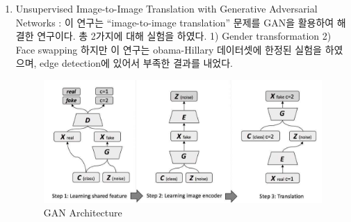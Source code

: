 \documentclass{oblivoir}
\begin{document}
\begin{enumerate}
\item Unsupervised Image-to-Image Translation with Generative Adversarial Networks : 이 연구는 “image-to-image translation” 문제를 GAN을 활용하여 해결한 연구이다. 총 2가지에 대해 실험을 하였다. 1) Gender transformation 2) Face swapping 하지만 이 연구는 obama-Hillary 데이터셋에 한정된 실험을 하였으며, edge detection에 있어서 부족한 결과를 내었다.

\begin{figure}[h!]
    \centering
      \includegraphics{pic/chp1/img613}
    \caption{ GAN Architecture\cite{reference5}}
\end{figure}

\end{enumerate}
\end{document}

